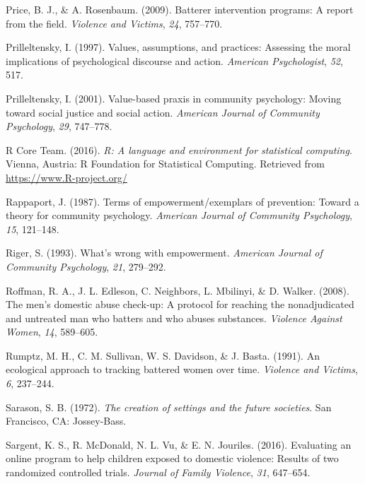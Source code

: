 \documentclass[11pt,]{tufte-book}
\begin{document}
\hypertarget{ref-price2009batterer}{}
Price, B. J., \& A. Rosenbaum. (2009). Batterer intervention programs: A
report from the field. \emph{Violence and Victims}, \emph{24}, 757--770.

\hypertarget{ref-prilleltensky1997values}{}
Prilleltensky, I. (1997). Values, assumptions, and practices: Assessing
the moral implications of psychological discourse and action.
\emph{American Psychologist}, \emph{52}, 517.

\hypertarget{ref-prilleltensky2001value-based}{}
Prilleltensky, I. (2001). Value-based praxis in community psychology:
Moving toward social justice and social action. \emph{American Journal
of Community Psychology}, \emph{29}, 747--778.

\hypertarget{ref-R-base}{}
R Core Team. (2016). \emph{R: A language and environment for statistical
computing}. Vienna, Austria: R Foundation for Statistical Computing.
Retrieved from \url{https://www.R-project.org/}

\hypertarget{ref-rappaport1987terms}{}
Rappaport, J. (1987). Terms of empowerment/exemplars of prevention:
Toward a theory for community psychology. \emph{American Journal of
Community Psychology}, \emph{15}, 121--148.

\hypertarget{ref-riger1993what}{}
Riger, S. (1993). What's wrong with empowerment. \emph{American Journal
of Community Psychology}, \emph{21}, 279--292.

\hypertarget{ref-roffman2008mens}{}
Roffman, R. A., J. L. Edleson, C. Neighbors, L. Mbilinyi, \& D. Walker.
(2008). The men's domestic abuse check-up: A protocol for reaching the
nonadjudicated and untreated man who batters and who abuses substances.
\emph{Violence Against Women}, \emph{14}, 589--605.

\hypertarget{ref-rumptz1991ecological}{}
Rumptz, M. H., C. M. Sullivan, W. S. Davidson, \& J. Basta. (1991). An
ecological approach to tracking battered women over time. \emph{Violence
and Victims}, \emph{6}, 237--244.

\hypertarget{ref-sarason1972creation}{}
Sarason, S. B. (1972). \emph{The creation of settings and the future
societies}. San Francisco, CA: Jossey-Bass.

\hypertarget{ref-sargent2016evaluating}{}
Sargent, K. S., R. McDonald, N. L. Vu, \& E. N. Jouriles. (2016).
Evaluating an online program to help children exposed to domestic
violence: Results of two randomized controlled trials. \emph{Journal of
Family Violence}, \emph{31}, 647--654.
\end{document}
